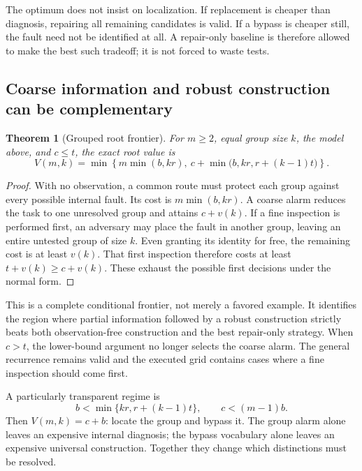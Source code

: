 \documentclass[11pt,letterpaper]{article}
\newtheorem{theorem}{Theorem}[section]
\theoremstyle{remark}\newtheorem{remark}{Remark}[section]
\begin{document}
The optimum does not insist on localization. If replacement is cheaper than diagnosis, repairing all remaining candidates is valid. If a bypass is cheaper still, the fault need not be identified at all. A repair-only baseline is therefore allowed to make the best such tradeoff; it is not forced to waste tests.

\subsection{Coarse information and robust construction can be complementary}
\begin{theorem}[Grouped root frontier]\label{thm:root}
For $m\ge2$, equal group size $k$, the model above, and $c\le t$, the exact root value is
\begin{equation}\label{eq:root}
\boxed{V(m,k)=\min\left\{m\min(b,kr),\ c+\min\bigl(b,kr,r+(k-1)t\bigr)\right\}.}
\end{equation}
\end{theorem}
\begin{proof}
With no observation, a common route must protect each group against every possible internal fault. Its cost is $m\min(b,kr)$. A coarse alarm reduces the task to one unresolved group and attains $c+v(k)$. If a fine inspection is performed first, an adversary may place the fault in another group, leaving an entire untested group of size $k$. Even granting its identity for free, the remaining cost is at least $v(k)$. That first inspection therefore costs at least $t+v(k)\ge c+v(k)$. These exhaust the possible first decisions under the normal form.
\end{proof}

This is a complete conditional frontier, not merely a favored example. It identifies the region where partial information followed by a robust construction strictly beats both observation-free construction and the best repair-only strategy. When $c>t$, the lower-bound argument no longer selects the coarse alarm. The general recurrence remains valid and the executed grid contains cases where a fine inspection should come first.

A particularly transparent regime is
\begin{equation}\label{eq:region}
b<\min\{kr,r+(k-1)t\},\qquad c<(m-1)b.
\end{equation}
Then $V(m,k)=c+b$: locate the group and bypass it. The group alarm alone leaves an expensive internal diagnosis; the bypass vocabulary alone leaves an expensive universal construction. Together they change which distinctions must be resolved.
\end{document}
